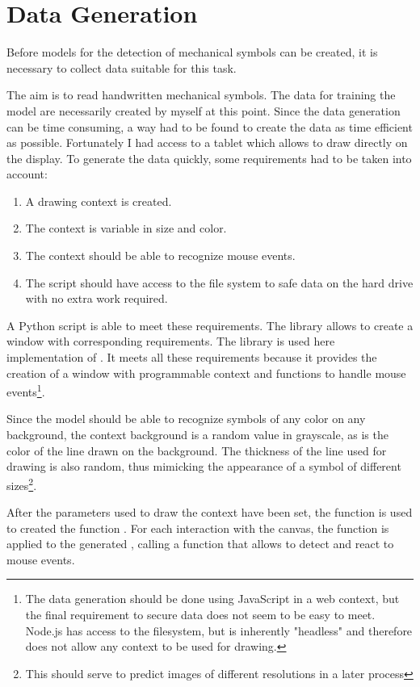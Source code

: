 \section{Data Generation}

Before models for the detection of mechanical symbols can be created, it is necessary to collect data suitable for this task.

The aim is to read handwritten mechanical symbols.
The data for training the model are necessarily created by myself at this point.
Since the data generation can be time consuming, a way had to be found to create the data as time efficient as possible.
Fortunately I had access to a tablet which allows to draw directly on the display.
To generate the data quickly, some requirements had to be taken into account:
\begin{enumerate}
    \item A drawing context is created.
    \item The context is variable in size and color.
    \item The context should be able to recognize mouse events.
    \item The script should have access to the file system to safe data on the hard drive with no extra work required.
\end{enumerate}

A Python script is able to meet these requirements.
The library  \cite{OpenCV2019} allows to create a window with corresponding requirements. The library  \cite{Heinisuo2019} is used here implementation of .
It meets all these requirements because it provides the creation of a window with programmable context and functions to handle mouse events\footnote{The data generation should be done using JavaScript in a web context, but the final requirement to secure data does not seem to be easy to meet. Node.js has access to the filesystem, but is inherently "headless" and therefore does not allow any context to be used for drawing. }.

Since the model should be able to recognize symbols of any color on any background, the context background is a random value in grayscale, as is the color of the line drawn on the background.
The thickness of the line used for drawing is also random, thus mimicking the appearance of a symbol of different sizes\footnote{This should serve to predict images of different resolutions in a later process}.

After the parameters used to draw the context have been set, the function  is used to  created the function . 
For each interaction with the canvas, the  function is applied to the generated , calling a  function that allows to detect and react to mouse events.

